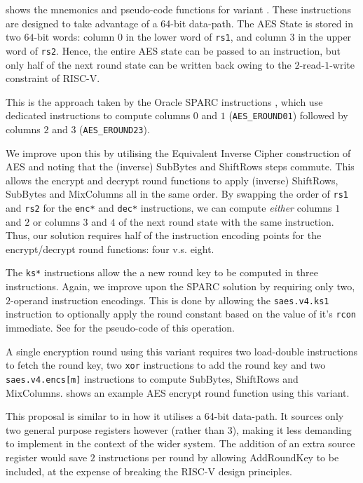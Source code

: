 
 shows the mnemonics and pseudo-code functions
for variant .
These instructions are designed to take advantage of a 64-bit
data-path.
The AES State is stored in two $64$-bit words: column $0$ in the
lower word of {\tt rs1}, and column $3$ in the upper word of {\tt rs2}.
Hence, the entire AES state can be passed to an instruction, but only
half of the next round state can be written back owing to the
$2$-read-$1$-write constraint of RISC-V.

This is the approach taken by the Oracle SPARC instructions
\cite[Page 109]{SPARC:16}, which use dedicated instructions to compute
columns $0$ and $1$ ({\tt AES\_EROUND01}) followed by
columns $2$ and $3$ ({\tt AES\_EROUND23}).

We improve upon this by utilising the Equivalent Inverse Cipher
construction of AES \cite[Section 5.4.4, Page 27]{FIPS:197}
and noting that the (inverse) SubBytes and ShiftRows steps commute.
This allows the encrypt and decrypt round functions to apply (inverse)
ShiftRows, SubBytes and MixColumns all in the same order.
By swapping the order of {\tt rs1} and {\tt rs2}
for the {\tt enc*} and {\tt dec*} instructions, we can compute {\em either}
columns $1$ and $2$ or columns $3$ and $4$ of the next round state with the
same instruction.
Thus, our solution requires half of the instruction encoding points
for the encrypt/decrypt round functions: four v.s. eight.

The {\tt ks*} instructions allow the a new round key to be computed
in three instructions.
Again, we improve upon the SPARC solution by requiring only two,
$2$-operand instruction encodings.
This is done by allowing the {\tt saes.v4.ks1} instruction
to optionally apply the round constant based on the value of
it's {\tt rcon} immediate.
See  for the pseudo-code of this
operation.

A single encryption round using this variant requires
two load-double instructions to fetch the round key,
two {\tt xor} instructions to add the round key
and
two {\tt saes.v4.encs[m]} instructions to compute SubBytes, ShiftRows
and MixColumns.
 shows an example AES encrypt round function
using this variant.

This proposal is similar to \cite{SPARC:16} in how it utilises
a 64-bit data-path.
It sources only two general purpose registers however (rather than $3$),
making it less demanding to implement in the context of the wider
system.
The addition of an extra source register would save $2$ instructions
per round by allowing AddRoundKey to be included, at the expense
of breaking the RISC-V design principles.


